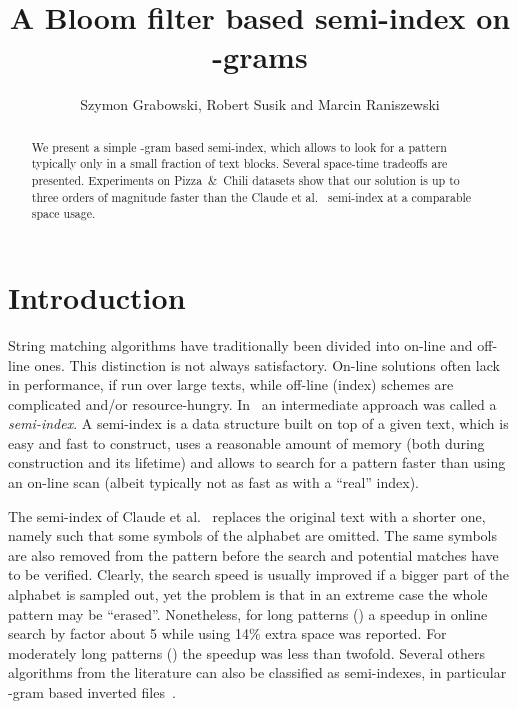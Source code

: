 \documentclass{llncs}
\begin{document}
\title{A Bloom filter based semi-index on -grams}

\author{Szymon Grabowski,
Robert Susik
and
Marcin Raniszewski
}


\maketitle


\begin{abstract}
We present a simple -gram based semi-index, which allows to look for 
a pattern typically only in a small fraction of text blocks.
Several space-time tradeoffs are presented. 
Experiments on Pizza~\&~Chili datasets show that our solution 
is up to three orders of magnitude faster than the 
Claude et al.~\cite{CNPSTjda10} semi-index at a comparable space usage.
\end{abstract}

\section{Introduction}
\noindent 
String matching algorithms have traditionally been divided 
into on-line and off-line ones.
This distinction is not always satisfactory.
On-line solutions often lack in performance, if run over large 
texts, while off-line (index) schemes are complicated and/or resource-hungry.
In~\cite{CNPSTjda10} an intermediate approach was called a {\em semi-index}.
A semi-index is a data structure built on top of a given text, 
which is easy and fast to construct, uses a reasonable amount of memory 
(both during construction and its lifetime) and allows to search for a 
pattern faster than using an on-line scan (albeit typically not as fast 
as with a ``real'' index).

The semi-index of Claude et al.~\cite{CNPSTjda10} replaces the original text 
with a shorter one, namely such that some symbols of the alphabet are omitted.
The same symbols are also removed from the pattern before the search 
and potential matches have to be verified.
Clearly, the search speed is usually improved if a bigger part of the alphabet 
is sampled out, yet the problem is that in an extreme case the whole pattern 
may be ``erased''.  
Nonetheless, for long patterns () a speedup in online search 
by factor about 5 while using 14\% extra space was reported. 
For moderately long patterns () the speedup was less than twofold.
Several others algorithms from the literature can also be classified 
as semi-indexes, in particular -gram based inverted files~\cite{PST2006}.
\end{document}
